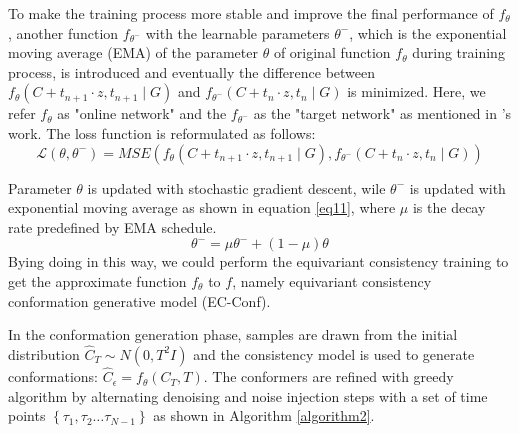 \documentclass{article} %
\begin{document}
To make the training process more stable and improve the final performance of $f_\theta$, another function $f_{\theta^{-}}$  with the learnable parameters $\theta^{-}$, which is the exponential moving average (EMA) of the parameter $\theta$ of original function $f_\theta$ during training process, is introduced and eventually the difference between $f_\theta\left(C+t_{n+1} \cdot z, t_{n+1} \mid G\right)$ and $f_{\theta^{-}}\left(C+t_n \cdot z, t_n \mid G\right)$ is minimized. Here, we refer $f_\theta$ as  "online network" and the $f_{\theta^{-}}$ as the "target network" as mentioned in \cite{song2020score} ’s work. The loss function is reformulated as follows:
\begin{equation}
	\mathcal{L}\left(\theta, \theta^{-}\right)=MSE\left(f_\theta\left(C+t_{n+1} \cdot z, t_{n+1} \mid G\right), f_{\theta^{-}}\left(C+t_n \cdot z, t_n \mid G\right)\right)
\end{equation}

Parameter $\theta$ is updated with stochastic gradient descent, wile $\theta^{-}$ is updated with exponential moving average as shown in equation \ref{eq11}, where $\mu$ is the decay rate predefined by EMA schedule.
\begin{equation}
	\theta^{-}=\mu \theta^{-}+(1-\mu) \theta
	\label{eq11}
\end{equation}
Bying doing in this way, we could perform the equivariant consistency training to get the approximate function $f_\theta$ to $f$, namely equivariant consistency conformation generative model (EC-Conf).


In the conformation generation phase, samples are drawn from the initial distribution $\widehat{C}_T \sim N\left(0, T^2 I\right)$ and the consistency model is used to generate conformations: $\widehat{C}_\epsilon=f_\theta\left(C_T, T\right)$. The conformers are refined with greedy algorithm by alternating denoising and noise injection steps with a set of time points $\left\{\tau_1, \tau_2 \ldots \tau_{N-1}\right\}$ as shown in Algorithm \ref{algorithm2}.
\end{document}
